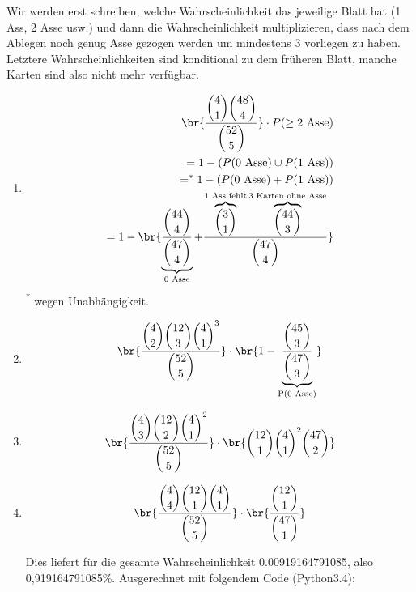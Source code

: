 \begin{enumerate}[a)]
  Wir werden erst schreiben, welche Wahrscheinlichkeit das jeweilige Blatt hat (1 Ass, 2 Asse usw.) und dann die Wahrscheinlichkeit multiplizieren, dass nach dem Ablegen noch genug Asse gezogen werden um mindestens 3 vorliegen zu haben. Letztere Wahrscheinlichkeiten sind konditional zu dem früheren Blatt, manche Karten sind also nicht mehr verfügbar.

  \begin{enumerate}
    \item
      \begin{align*}
        \br{\frac{\dbinom{4}{1} \dbinom{48}{4} }{ \dbinom{52}{5} }} \cdot P(\geq \text{2 Asse}) \\
                                    = 1 - (P(\text{0 Asse}) \cup P(\text{1 Ass}))\\
                                    =^{*} 1 - (P(\text{0 Asse}) + P(\text{1 Ass}))\\
                                    = 1- \br{ \underbrace{\frac{\dbinom{44}{4}}{\dbinom{47}{4}}}_{\text{0 Asse}} +
                                        \frac{ \overbrace{\dbinom{3}{1}}^{\text{1 Ass fehlt}} \overbrace{\dbinom{44}{3}}^{\text{3 Karten ohne Asse}}}{ \dbinom{47}{4} } }\\
      \end{align*}
      \textsuperscript{*} wegen Unabhängigkeit.
    \item
      \begin{align*}
        \br{ \frac{ \dbinom{4}{2} \dbinom{12}{3} \dbinom{4}{1}^{3} }{ \dbinom{52}{5} }  }
                \cdot \br{ 1 - \underbrace{\frac{ \dbinom{45}{3} }{\dbinom{47}{3} }}_{\text{P(0 Asse)}} }
      \end{align*}

    \item
      \begin{align*}
        \br{ \frac{ \dbinom{4}{3} \dbinom{12}{2} \dbinom{4}{1}^{2} }{\dbinom{52}{5}} }
          \cdot \br{ \dbinom{12}{1} \dbinom{4}{1}^{2}{\dbinom{47}{2}} }
      \end{align*}
    \item
      \begin{align*}
        \br{ \frac{ \dbinom{4}{4} \dbinom{12}{1} \dbinom{4}{1} }{\dbinom{52}{5}} }
            \cdot \br{\frac{\dbinom{12}{1}}{\dbinom{47}{1}}}
      \end{align*}

    Dies liefert für die gesamte Wahrscheinlichkeit 0.00919164791085, also 0,919164791085\%.
    Ausgerechnet mit folgendem Code (Python3.4):


\end{enumerate}
\end{enumerate}
